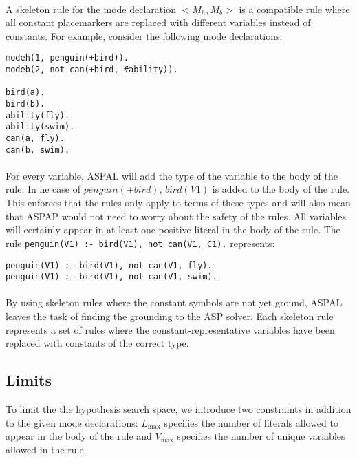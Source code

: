 \documentclass{article}
\theoremstyle{plain}
\theoremstyle{definition}
\begin{document}
\begin{multicols}{2}
\paragraph{} A skeleton rule for the mode declaration $<M_h, M_b>$ is a compatible rule where all constant placemarkers are replaced with different variables instead of constants. For example, consider the following mode declarations:

\begin{lstlisting}
modeh(1, penguin(+bird)).
modeb(2, not can(+bird, #ability)).

bird(a).
bird(b).
ability(fly).
ability(swim).
can(a, fly).
can(b, swim).
\end{lstlisting}

\paragraph{} For every variable, ASPAL will add the type of the variable to the body of the rule. In he case of $penguin(+bird)$, $bird(V1)$ is added to the body of the rule. This enforces that the rules only apply to terms of these types and will also mean that ASPAP would not need to worry about the safety of the rules. All variables will certainly appear in at least one positive literal in the body of the rule. The rule  \lstinline{penguin(V1) :- bird(V1), not can(V1, C1).} represents:

\begin{lstlisting}
penguin(V1) :- bird(V1), not can(V1, fly).
penguin(V1) :- bird(V1), not can(V1, swim).
\end{lstlisting}

\paragraph{} By using skeleton rules where the constant symbols are not yet ground, ASPAL leaves the task of finding the grounding to the ASP solver. Each skeleton rule represents a set of rules where the constant-representative variables have been replaced with constants of the correct type.

\subsection{Limits}

To limit the the hypothesis search space, we introduce two constraints in addition to the given mode declarations: $L_\text{max}$ specifies the number of literals allowed to appear in the body of the rule and $V_\text{max}$ specifies the number of unique variables allowed in the rule.


\end{multicols}
\end{document}
